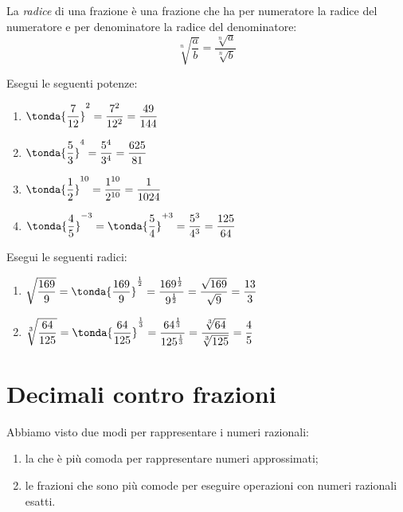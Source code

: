 \begin{definizione}{}{}
La \emph{radice} di una frazione è una frazione che ha per numeratore la 
radice del numeratore e per denominatore la radice del denominatore:
\[\sqrt[n]{\dfrac{a}{b}} = \dfrac{\sqrt[n]{a}}{\sqrt[n]{b}}\]
\end{definizione}

\begin{esempio}{}{}
Esegui le seguenti potenze:
\begin{htmulticols}{2}
\begin{enumerate} %
\item \(\tonda{\dfrac{7}{12}}^2 = \dfrac{7^2}{12^2} = \dfrac{49}{144}\)
\item \(\tonda{\dfrac{5}{3}}^4 = \dfrac{5^4}{3^4} = \dfrac{625}{81}\)
\item \(\tonda{\dfrac{1}{2}}^{10} = \dfrac{1^{10}}{2^{10}} = 
        \dfrac{1}{1024}\)
\item \(\tonda{\dfrac{4}{5}}^{-3} = \tonda{\dfrac{5}{4}}^{+3} = 
        \dfrac{5^3}{4^3} = \dfrac{125}{64}\)
\end{enumerate}
\end{htmulticols}
\end{esempio}

\begin{esempio}{}{}
Esegui le seguenti radici:
\begin{enumerate} %
\item 
\(\sqrt{\dfrac{169}{9}} = \tonda{\dfrac{169}{9}}^{\frac{1}{2}} =
  \dfrac{169^{\frac{1}{2}}}{9^{\frac{1}{2}}} = 
  \dfrac{\sqrt{169}}{\sqrt{9}} = 
  \dfrac{13}{3}\)
\item 
\(\sqrt[3]{\dfrac{64}{125}} = \tonda{\dfrac{64}{125}}^{\frac{1}{3}} =
  \dfrac{64^{\frac{1}{3}}}{125^{\frac{1}{3}}} = 
  \dfrac{\sqrt[3]{64}}{\sqrt[3]{125}} = \dfrac{4}{5}\)
\end{enumerate}
\end{esempio}

\section{Decimali contro frazioni}
\label{sec:razionali_decimali_frazioni}

Abbiamo visto due modi per rappresentare i numeri razionali:
\begin{enumerate}
 \item la  che è più comoda per 
rappresentare numeri approssimati;
 \item le frazioni che sono più comode per eseguire operazioni con 
numeri razionali esatti.
\end{enumerate}

